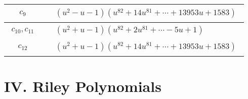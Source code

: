 \documentclass[1p]{elsarticle_modified}
\theoremstyle{definition}
\begin{document}
\begin{tabular}{m{50pt}|m{274pt}}
\hline $$\begin{aligned}c_{9}\end{aligned}$$&$\begin{aligned}
&(u^2- u-1)(u^{82}+14 u^{81}+\cdots+13953 u+1583)
\end{aligned}$\\
\hline $$\begin{aligned}c_{10},c_{11}\end{aligned}$$&$\begin{aligned}
&(u^2+u-1)(u^{82}+2 u^{81}+\cdots-5 u+1)
\end{aligned}$\\
\hline $$\begin{aligned}c_{12}\end{aligned}$$&$\begin{aligned}
&(u^2+u-1)(u^{82}+14 u^{81}+\cdots+13953 u+1583)
\end{aligned}$\\
\hline
\end{tabular}\newpage\renewcommand{\arraystretch}{1}
\centering \section*{ IV. Riley Polynomials}
\end{document}
